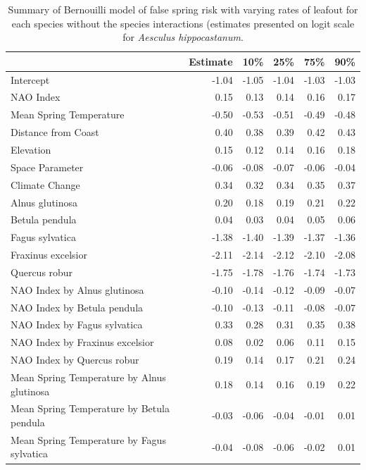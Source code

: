 \documentclass{article}\usepackage[]{graphicx}\usepackage[]{color}
\begin{document}
\begin{longtable}{lrrrrr}
\caption{Summary of Bernouilli model of false spring risk with varying rates of leafout for each species without the species interactions (estimates presented on logit scale for \textit{Aesculus hippocastanum}.} \\ 
  \hline
 & Estimate & 10\% & 25\% & 75\% & 90\% \\ 
  \hline \endhead  \hline
Intercept & -1.04 & -1.05 & -1.04 & -1.03 & -1.03 \\ 
  NAO Index & 0.15 & 0.13 & 0.14 & 0.16 & 0.17 \\ 
  Mean Spring 
Temperature & -0.50 & -0.53 & -0.51 & -0.49 & -0.48 \\ 
  Distance from 
Coast & 0.40 & 0.38 & 0.39 & 0.42 & 0.43 \\ 
  Elevation & 0.15 & 0.12 & 0.14 & 0.16 & 0.18 \\ 
  Space Parameter & -0.06 & -0.08 & -0.07 & -0.06 & -0.04 \\ 
  Climate Change & 0.34 & 0.32 & 0.34 & 0.35 & 0.37 \\ 
  Alnus glutinosa & 0.20 & 0.18 & 0.19 & 0.21 & 0.22 \\ 
  Betula pendula & 0.04 & 0.03 & 0.04 & 0.05 & 0.06 \\ 
  Fagus sylvatica & -1.38 & -1.40 & -1.39 & -1.37 & -1.36 \\ 
  Fraxinus excelsior & -2.11 & -2.14 & -2.12 & -2.10 & -2.08 \\ 
  Quercus robur & -1.75 & -1.78 & -1.76 & -1.74 & -1.73 \\ 
  NAO Index
by Alnus glutinosa & -0.10 & -0.14 & -0.12 & -0.09 & -0.07 \\ 
  NAO Index
by Betula pendula & -0.10 & -0.13 & -0.11 & -0.08 & -0.07 \\ 
  NAO Index
by Fagus sylvatica & 0.33 & 0.28 & 0.31 & 0.35 & 0.38 \\ 
  NAO Index
by Fraxinus excelsior & 0.08 & 0.02 & 0.06 & 0.11 & 0.15 \\ 
  NAO Index
by Quercus robur & 0.19 & 0.14 & 0.17 & 0.21 & 0.24 \\ 
  Mean Spring 
Temperature
by Alnus glutinosa & 0.18 & 0.14 & 0.16 & 0.19 & 0.22 \\ 
  Mean Spring 
Temperature
by Betula pendula & -0.03 & -0.06 & -0.04 & -0.01 & 0.01 \\ 
  Mean Spring 
Temperature
by Fagus sylvatica & -0.04 & -0.08 & -0.06 & -0.02 & 0.01 \\ 

\end{longtable}
\end{document}
